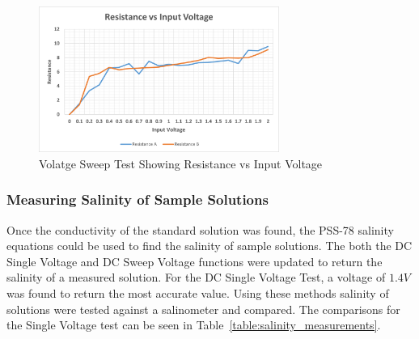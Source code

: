 \begin{figure}[H]\label{fig:sal_vsweepdc}
    \centering
    \includegraphics[width=0.7\textwidth]{figures/sal_vsweep.png}
    \caption{Volatge Sweep Test Showing Resistance vs Input Voltage}
    \label{fig:sal_vsweepdc}
\end{figure}

\subsubsection{Measuring Salinity of Sample Solutions}
Once the conductivity of the standard solution was found, the PSS-78 salinity equations could be used to find the salinity of sample solutions.
The both the DC Single Voltage and DC Sweep Voltage functions were updated to return the salinity of a measured solution.
For the DC Single Voltage Test, a voltage of $1.4V$ was found to return the most accurate value.
Using these methods salinity of solutions were tested against a salinometer and compared.
The comparisons for the Single Voltage test can be seen in Table~\ref{table:salinity_measurements}.


